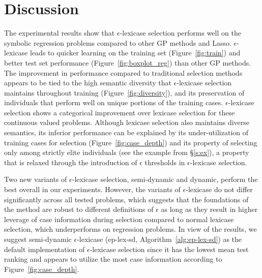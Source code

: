 \documentclass[twoside]{article}
\newcommand{\edit}[1]{{\color{red} #1}}
\begin{document}
\section{Discussion}\label{s:discuss}
The experimental results show that $\epsilon$-lexicase selection performs well on the symbolic regression problems compared to other \edit{GP} methods \edit{and Lasso}. $\epsilon$-lexicase leads to quicker learning on the training set (Figure~\ref{fig:train}) and better test set performance (Figure~\ref{fig:boxplot_reg}) \edit{than other GP methods}. The improvement in performance compared to traditional selection methods appears to be tied to the high semantic diversity that $\epsilon$-lexicase selection maintains throughout training (Figure~\ref{fig:diversity}), and its preservation of individuals that perform well on unique portions of the training cases. $\epsilon$-lexicase selection shows a categorical improvement over lexicase selection for these continuous valued problems. Although lexicase selection also maintains diverse semantics, its inferior performance can be explained by its under-utilization of training cases for selection (Figure~\ref{fig:case_depth}) and its property of selecting only among strictly elite individuals (see the example from \S\ref{s:ex}), a property that is relaxed through the introduction of $\epsilon$ thresholds in $\epsilon$-lexicase selection.   

Two new variants of $\epsilon$-lexicase selection, semi-dynamic and dynamic, perform the best overall in our experiments. However, the variants of $\epsilon$-lexicase do not differ significantly across all tested problems, which suggests that the foundations of the method are robust to different definitions of $\epsilon$ as long as they result in higher leverage of case information during selection compared to normal lexicase selection, which underperforms on regression problems. In view of the results, we suggest semi-dynamic $\epsilon$-lexicase (ep-lex-sd, Algorithm~\ref{alg:ep-lex-sd}) as the default implementation of $\epsilon$-lexicase selection since it has the lowest mean test ranking and appears to utilize the most case information according to Figure~\ref{fig:case_depth}. 
\end{document}

